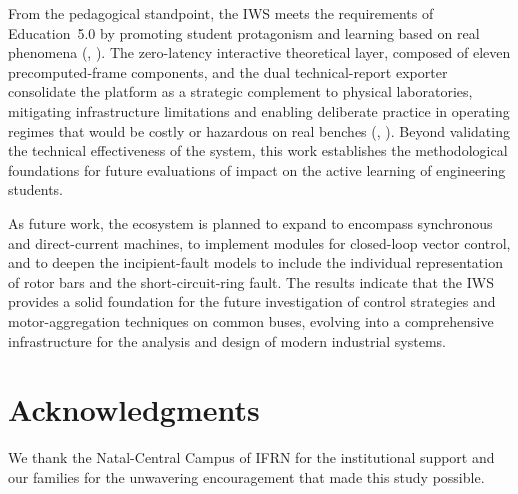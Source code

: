 \documentclass[a4paper]{ifacconf}
\begin{document}
From the pedagogical standpoint, the IWS meets the requirements of Education~5.0 by promoting student protagonism and learning based on real phenomena (\citeauthor{cordeiro2024educacao}, \citeyear{cordeiro2024educacao}). The zero-latency interactive theoretical layer, composed of eleven precomputed-frame components, and the dual technical-report exporter consolidate the platform as a strategic complement to physical laboratories, mitigating infrastructure limitations and enabling deliberate practice in operating regimes that would be costly or hazardous on real benches (\citeauthor{singh2019improving}, \citeyear{singh2019improving}). Beyond validating the technical effectiveness of the system, this work establishes the methodological foundations for future evaluations of impact on the active learning of engineering students.

As future work, the ecosystem is planned to expand to encompass synchronous and direct-current machines, to implement modules for closed-loop vector control, and to deepen the incipient-fault models to include the individual representation of rotor bars and the short-circuit-ring fault. The results indicate that the IWS provides a solid foundation for the future investigation of control strategies and motor-aggregation techniques on common buses, evolving into a comprehensive infrastructure for the analysis and design of modern industrial systems.

\section*{Acknowledgments}

We thank the Natal-Central Campus of IFRN for the institutional support and our families for the unwavering encouragement that made this study possible.


\end{document}
